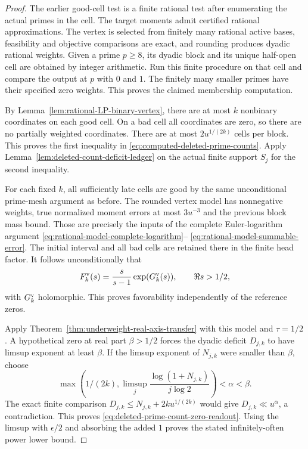 \documentclass[11pt]{article}
\theoremstyle{definition}
\begin{document}
\begin{proof}
The earlier good-cell test is a finite rational test after
enumerating the actual primes in the cell. The target moments
admit certified rational approximations.
The vertex is selected from finitely many rational active
bases, feasibility and objective comparisons are exact,
and rounding produces dyadic rational weights.
Given a prime $p\ge8$, its dyadic block and its unique
half-open cell are obtained by integer arithmetic.
Run this finite procedure on that cell and compare the
output at $p$ with $0$ and $1$. The finitely many smaller
primes have their specified zero weights.
This proves the claimed membership computation.

By Lemma~\ref{lem:rational-LP-binary-vertex}, there are at most
$k$ nonbinary coordinates on each good cell. On a bad cell
all coordinates are zero, so there are no partially weighted
coordinates. There are at most $2u^{1/(2k)}$ cells per block.
This proves the first inequality in
\eqref{eq:computed-deleted-prime-counts}.
Apply Lemma~\ref{lem:deleted-count-deficit-ledger} on the
actual finite support $S_j$ for the second inequality.

For each fixed $k$, all sufficiently late cells are good
by the same unconditional prime-mesh argument as before.
The rounded vertex model has nonnegative weights, true
normalized moment errors at most $3u^{-3}$ and the previous
block mass bound. Those are precisely the inputs of the
complete Euler-logarithm argument
\eqref{eq:rational-model-complete-logarithm}--%
\eqref{eq:rational-model-summable-error}.
The initial interval and all bad cells are retained there
in the finite head factor. It follows unconditionally that
\[
 F_k^{\rm v}(s)=\frac{s}{s-1}\exp(G_k^{\rm v}(s)),
                     \qquad \Re s>1/2,
\]
with $G_k^{\rm v}$ holomorphic.
This proves favorability independently of the reference zeros.

Apply Theorem~\ref{thm:underweight-real-axis-transfer} with
this model and $\tau=1/2$. A hypothetical zero at real part
$\beta>1/2$ forces the dyadic deficit $D_{j,k}$ to have
limsup exponent at least $\beta$.
If the limsup exponent of $N_{j,k}$ were smaller than
$\beta$, choose
\[
 \max\left(1/(2k),
       \limsup_j\frac{\log(1+N_{j,k})}{j\log2}\right)
                               <\alpha<\beta.
\]
The exact finite comparison
$D_{j,k}\le N_{j,k}+2k u^{1/(2k)}$ would give
$D_{j,k}\ll u^\alpha$, a contradiction.
This proves \eqref{eq:deleted-prime-count-zero-readout}.
Using the limsup with $\epsilon/2$ and absorbing the added
$1$ proves the stated infinitely-often power lower bound.


\end{proof}
\end{document}
